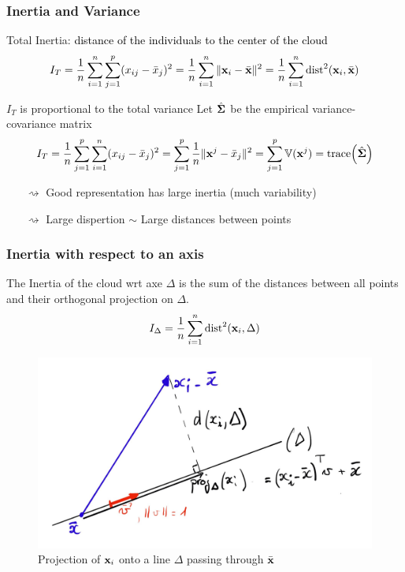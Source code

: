 \documentclass{beamer}\usepackage[]{graphicx}\usepackage[]{color}
\begin{document}
\begin{frame}
  \frametitle{Inertia and Variance}

\begin{block}{Total Inertia: \textcolor{black}{distance of the individuals to the center of the cloud}}
  \[
      I_T = \frac{1}{n}\sum_{i=1}^n \sum_{j=1}^p  (x_{ij}- \bar{x}_{j}) ^2 
      = \frac{1}{n}\sum_{i=1}^n \|\mathbf{x}_i - \bar{\mathbf{x}} \|^2  
      = \frac{1}{n}\sum_{i=1}^n \text{dist}^2 (\mathbf{x}_i,\bar{\mathbf{x}})
    \]
\end{block}

  \begin{block}{$I_T$ is proportional to the total variance}
  Let $\hat{\boldsymbol{\Sigma}}$ be the empirical variance-covariance matrix
\[
      I_T = \frac{1}{n}\sum_{j=1}^p  \sum_{i=1}^n (x_{ij}- \bar{x}_{j}) ^2 
      = \sum_{j=1}^p \frac{1}{n}\|\mathbf{x}^j - \bar{x}_{j} \|^2
      = \sum_{j=1}^p \mathbb{V}(\mathbf{x}^j) = \mathrm{trace}{\left(\hat{\boldsymbol{\Sigma}}\right)}
\]
\end{block}

\begin{itemize}
  \item[$\rightsquigarrow$] \alert{Good representation has large inertia} (much variability)
  \item[$\rightsquigarrow$] \alert{Large dispertion $\sim$ Large distances between points}
\end{itemize}
  
\end{frame}

\begin{frame}
  \frametitle{Inertia with respect to an axis}

  The Inertia of the cloud wrt axe $\Delta$ is the sum of the distances between all points and their orthogonal projection on $\Delta$.
  \begin{equation*}
    \begin{aligned}
      I_\Delta = \frac{1}{n}\sum_{i=1}^n \text{dist}^2(\mathbf{x}_i, \Delta)
      \end{aligned}
  \end{equation*}

  \begin{figure}
    \includegraphics[width=.7\textwidth]{proj_axis}
    \caption{Projection of $\mathbf{x}_i$ onto a line $\Delta$ passing through $\bar{\mathbf{x}}$}
  \end{figure}

\end{frame}
\end{document}
